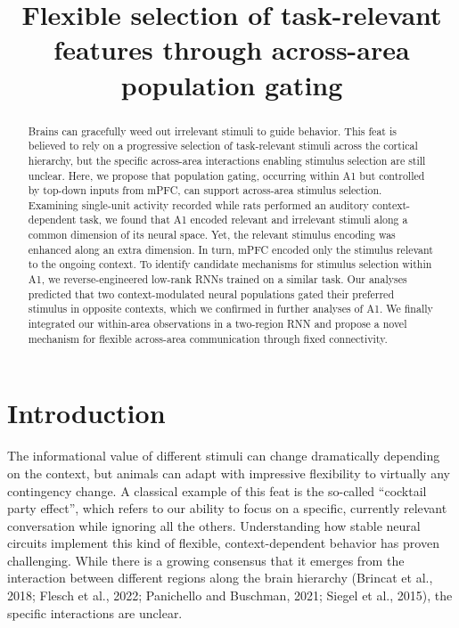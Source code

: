 \documentclass[12pt]{article}
\begin{document}
\title{Flexible selection of task-relevant features through across-area population gating}
\maketitle


\begin{abstract}
Brains can gracefully weed out irrelevant stimuli to guide behavior. This feat is believed to rely on a progressive selection of task-relevant stimuli across the cortical hierarchy, but the specific across-area interactions enabling stimulus selection are still unclear. Here, we propose that population gating, occurring within A1 but controlled by top-down inputs from mPFC, can support across-area stimulus selection. \\

Examining single-unit activity recorded while rats performed an auditory context-dependent task, we found that A1 encoded relevant and irrelevant stimuli along a common dimension of its neural space. Yet, the relevant stimulus encoding was enhanced along an extra dimension. In turn, mPFC encoded only the stimulus relevant to the ongoing context. To identify candidate mechanisms for stimulus selection within A1, we reverse-engineered low-rank RNNs trained on a similar task. Our analyses predicted that two context-modulated neural populations gated their preferred stimulus in opposite contexts, which we confirmed in further analyses of A1. We finally integrated our within-area observations in a two-region RNN and propose a novel mechanism for flexible across-area communication through fixed connectivity.


\end{abstract}



\section*{Introduction}
The informational value of different stimuli can change dramatically depending on the context, but animals can adapt with impressive flexibility to virtually any contingency change. A classical example of this feat is the so-called “cocktail party effect”, which refers to our ability to focus on a specific, currently relevant conversation while ignoring all the others. Understanding how stable neural circuits implement this kind of flexible, context-dependent behavior has proven challenging. While there is a growing consensus that it emerges from the interaction between different regions along the brain hierarchy (Brincat et al., 2018; Flesch et al., 2022; Panichello and Buschman, 2021; Siegel et al., 2015), the specific interactions are unclear. \\
\end{document}
